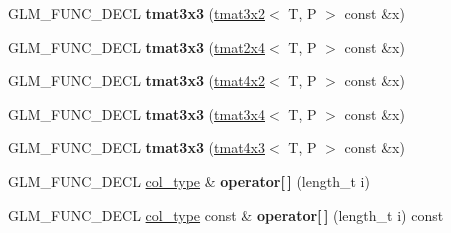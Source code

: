 \begin{DoxyCompactItemize}
\item 
\hypertarget{structglm_1_1detail_1_1tmat3x3_ad518c170d44ccf4b1d2d92559a2769b6}{G\-L\-M\-\_\-\-F\-U\-N\-C\-\_\-\-D\-E\-C\-L {\bfseries tmat3x3} (\hyperlink{structglm_1_1detail_1_1tmat3x2}{tmat3x2}$<$ T, P $>$ const \&x)}\label{structglm_1_1detail_1_1tmat3x3_ad518c170d44ccf4b1d2d92559a2769b6}

\item 
\hypertarget{structglm_1_1detail_1_1tmat3x3_a98fab3111797488d43d13de3b9c34db9}{G\-L\-M\-\_\-\-F\-U\-N\-C\-\_\-\-D\-E\-C\-L {\bfseries tmat3x3} (\hyperlink{structglm_1_1detail_1_1tmat2x4}{tmat2x4}$<$ T, P $>$ const \&x)}\label{structglm_1_1detail_1_1tmat3x3_a98fab3111797488d43d13de3b9c34db9}

\item 
\hypertarget{structglm_1_1detail_1_1tmat3x3_a727ffba03de5a02331f41858742f8d09}{G\-L\-M\-\_\-\-F\-U\-N\-C\-\_\-\-D\-E\-C\-L {\bfseries tmat3x3} (\hyperlink{structglm_1_1detail_1_1tmat4x2}{tmat4x2}$<$ T, P $>$ const \&x)}\label{structglm_1_1detail_1_1tmat3x3_a727ffba03de5a02331f41858742f8d09}

\item 
\hypertarget{structglm_1_1detail_1_1tmat3x3_a3c9ff04e39cb4cd6d0b4710683d7ab8c}{G\-L\-M\-\_\-\-F\-U\-N\-C\-\_\-\-D\-E\-C\-L {\bfseries tmat3x3} (\hyperlink{structglm_1_1detail_1_1tmat3x4}{tmat3x4}$<$ T, P $>$ const \&x)}\label{structglm_1_1detail_1_1tmat3x3_a3c9ff04e39cb4cd6d0b4710683d7ab8c}

\item 
\hypertarget{structglm_1_1detail_1_1tmat3x3_a3c3870ea513e58b0a44ca5e6abedcc71}{G\-L\-M\-\_\-\-F\-U\-N\-C\-\_\-\-D\-E\-C\-L {\bfseries tmat3x3} (\hyperlink{structglm_1_1detail_1_1tmat4x3}{tmat4x3}$<$ T, P $>$ const \&x)}\label{structglm_1_1detail_1_1tmat3x3_a3c3870ea513e58b0a44ca5e6abedcc71}

\item 
\hypertarget{structglm_1_1detail_1_1tmat3x3_ac99796f89cd590265d02f98850605043}{G\-L\-M\-\_\-\-F\-U\-N\-C\-\_\-\-D\-E\-C\-L \hyperlink{structglm_1_1detail_1_1tvec3}{col\-\_\-type} \& {\bfseries operator\mbox{[}$\,$\mbox{]}} (length\-\_\-t i)}\label{structglm_1_1detail_1_1tmat3x3_ac99796f89cd590265d02f98850605043}

\item 
\hypertarget{structglm_1_1detail_1_1tmat3x3_a404a55af6f9769133ec0631479f077b6}{G\-L\-M\-\_\-\-F\-U\-N\-C\-\_\-\-D\-E\-C\-L \hyperlink{structglm_1_1detail_1_1tvec3}{col\-\_\-type} const \& {\bfseries operator\mbox{[}$\,$\mbox{]}} (length\-\_\-t i) const }\label{structglm_1_1detail_1_1tmat3x3_a404a55af6f9769133ec0631479f077b6}


\end{DoxyCompactItemize}
